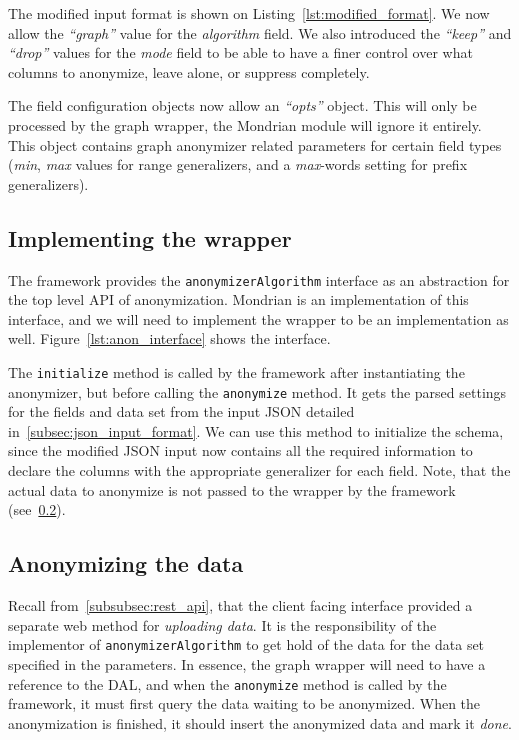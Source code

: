 \vspace{\baselineskip}



The modified input format is shown on Listing~\ref{lst:modified_format}. We now allow the \textit{``graph''} value for the \textit{algorithm} field. We also introduced the \textit{``keep''} and \textit{``drop''} values for the \textit{mode} field to be able to have a finer control over what columns to anonymize, leave alone, or suppress completely.

The field configuration objects now allow an \textit{``opts''} object. This will only be processed by the graph wrapper, the Mondrian module will ignore it entirely. This object contains graph anonymizer related parameters for certain field types (\textit{min}, \textit{max} values for range generalizers, and a \textit{max}-words setting for prefix generalizers).

\subsection{Implementing the wrapper}

The framework provides the \texttt{anonymizerAlgorithm} interface as an abstraction for the top level API of anonymization. Mondrian is an implementation of this interface, and we will need to implement the wrapper to be an implementation as well. Figure~\ref{lst:anon_interface} shows the interface.

\vspace{\baselineskip}


The \texttt{initialize} method is called by the framework after instantiating the anonymizer, but before calling the \texttt{anonymize} method. It gets the parsed settings for the fields and data set from the input JSON detailed in~\ref{subsec:json_input_format}. We can use this method to initialize the schema, since the modified JSON input now contains all the required information to declare the columns with the appropriate generalizer for each field. Note, that the actual data to anonymize is not passed to the wrapper by the framework (see~\ref{subsec:anonymizing_the_data}).

\subsection{Anonymizing the data}\label{subsec:anonymizing_the_data}

Recall from~\ref{subsubsec:rest_api}, that the client facing interface provided a separate web method for \emph{uploading data}. It is the responsibility of the implementor of \texttt{anonymizerAlgorithm} to get hold of the data for the data set specified in the parameters. In essence, the graph wrapper will need to have a reference to the DAL, and when the \texttt{anonymize} method is called by the framework, it must first query the data waiting to be anonymized. When the anonymization is finished, it should insert the anonymized data and mark it \emph{done}.

